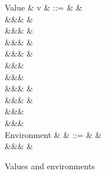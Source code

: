 \begin{figure}
\begin{syntaxfig}
\mbox{Value}
&
v
&
::=
&
\bot
&
\\
&&&
\exTrue \mid \exFalse
&
\\
&&&
&
\\
&&&
&
\\
&&&
&
\\
&&&
\\
&&&
\\
&&&
\exNil
&
\\
&&&
&
\\
&&&
\\
&&&
\\[2mm]
\mbox{Environment}
&
\rho
&
::=
&
\envEmpty
&
\\
&&&
&
\end{syntaxfig}
\caption{Values and environments}
\end{figure}
